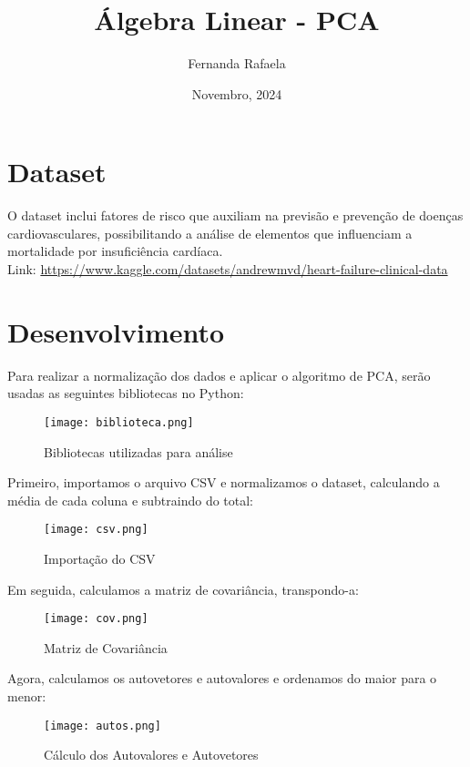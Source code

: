 \documentclass{article}
\title{Álgebra Linear - PCA}
\author{Fernanda Rafaela}
\date{Novembro, 2024}
\begin{document}
\maketitle

\section{Dataset}
O dataset inclui fatores de risco que auxiliam na previsão e prevenção de doenças cardiovasculares, possibilitando a análise de elementos que influenciam a mortalidade por insuficiência cardíaca.\\
Link: \url{https://www.kaggle.com/datasets/andrewmvd/heart-failure-clinical-data}

\section{Desenvolvimento}
Para realizar a normalização dos dados e aplicar o algoritmo de PCA, serão usadas as seguintes bibliotecas no Python:

\begin{figure}[H]
    \centering
    \texttt{[image: biblioteca.png]}
    \caption{Bibliotecas utilizadas para análise}
    \label{fig:bibliotecas}
\end{figure}

Primeiro, importamos o arquivo CSV e normalizamos o dataset, calculando a média de cada coluna e subtraindo do total:

\begin{figure}[H]
    \centering
    \texttt{[image: csv.png]} 
    \caption{Importação do CSV}
    \label{fig:import_csv}
\end{figure}

Em seguida, calculamos a matriz de covariância, transpondo-a:

\begin{figure}[H]
    \centering
    \texttt{[image: cov.png]}
    \caption{Matriz de Covariância}
    \label{fig:covariancia}
\end{figure}

Agora, calculamos os autovetores e autovalores e ordenamos do maior para o menor:

\begin{figure}[H]
    \centering
    \texttt{[image: autos.png]}
    \caption{Cálculo dos Autovalores e Autovetores}
    \label{fig:autovalores}
\end{figure}
\end{document}
